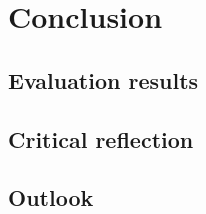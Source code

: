\chapter{Conclusion}

\section{Evaluation results}

\section{Critical reflection}

\section{Outlook}

